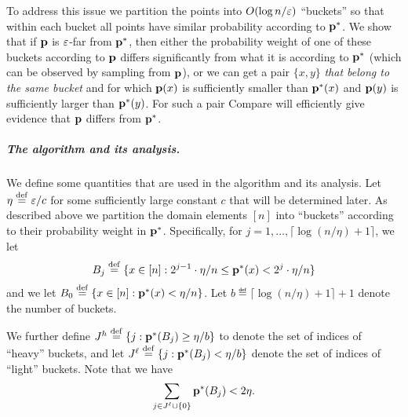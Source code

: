 To address this issue
we partition the points into $O(\log n/\varepsilon)$
``buckets'' so that within each bucket
all points have similar probability according to $\mathbf{p}^\ast$. We
show that if $\mathbf{p}$ is $\varepsilon$-far from $\mathbf{p}^\ast$, then either
the probability weight of one of these buckets according to $\mathbf{p}$
differs significantly from what it is according to $\mathbf{p}^\ast$
(which can be observed by sampling from $\mathbf{p}$), or we can get
a pair $\{x,y\}$ {\em that belong to the same bucket\/} and for
which $\mathbf{p}(x)$ is sufficiently smaller than $\mathbf{p}^\ast(x)$ and
$\mathbf{p}(y)$ is sufficiently larger than $\mathbf{p}^\ast(y)$.  For such a pair
{\sc Compare} will efficiently give evidence that
$\mathbf{p}$ differs from $\mathbf{p}^\ast$.

\medskip

\subparagraph{The algorithm and its analysis.}
We define some quantities that are used in the algorithm and its analysis.
Let ${\eta} \stackrel{\rm def}{=} \varepsilon/c$ for some sufficiently large constant $c$
that will be determined later.
As described above we partition the domain elements $[n]$ into
``buckets'' according
to their probability weight in $\mathbf{p}^\ast$.
Specifically, for $j = 1,\dots, \lceil \log(n/\eta)+1\rceil$, we let
\begin{equation} \label{eq:Bj-def}
B_j \stackrel{\rm def}{=} \{x \in [n]: 2^{j-1}\cdot \eta/n \leq \mathbf{p}^\ast(x) < 2^j\cdot \eta/n\}
\end{equation}
and we let $B_0 \stackrel{\rm def}{=} \{x \in [n]: \mathbf{p}^\ast(x) < \eta/n\}$.
Let $b \eqdef \lceil \log(n/\eta)+1\rceil +1$ denote the number of buckets.

We further define $J^h \stackrel{\rm def}{=} \{j: \mathbf{p}^\ast(B_j) \geq \eta/b\}$ to denote the set of indices
of ``heavy'' buckets, and let
$J^\ell \stackrel{\rm def}{=}\{j: \mathbf{p}^\ast(B_j)< \eta/b\}$ denote the set of indices
of ``light'' buckets.  Note that we have
\begin{equation} \label{eq:Jell-light}
\sum_{j\in J^\ell\cup \{0\}}\mathbf{p}^\ast(B_j) < 2\eta.
\end{equation}


